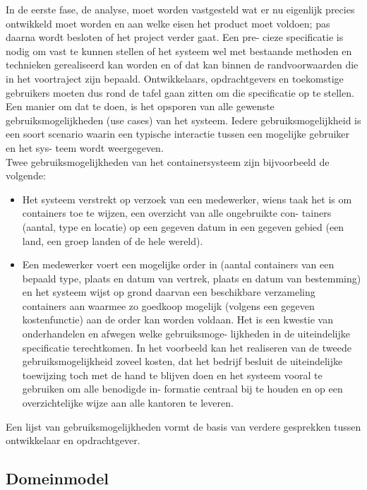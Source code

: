 \documentclass{article}
\begin{document}
	In de eerste fase, de analyse, moet worden vastgesteld wat er nu eigenlijk
	precies ontwikkeld moet worden en aan welke eisen het product moet
	voldoen; pas daarna wordt besloten of het project verder gaat. Een pre-
	cieze specificatie is nodig om vast te kunnen stellen of het systeem wel
	met bestaande methoden en technieken gerealiseerd kan worden en of
	dat kan binnen de randvoorwaarden die in het voortraject zijn bepaald.
	Ontwikkelaars, opdrachtgevers en toekomstige gebruikers moeten dus
	rond de tafel gaan zitten om die specificatie op te stellen. Een manier om
	dat te doen, is het opsporen van alle gewenste gebruiksmogelijkheden (use
	cases) van het systeem. Iedere gebruiksmogelijkheid is een soort scenario
	waarin een typische interactie tussen een mogelijke gebruiker en het sys-
	teem wordt weergegeven. \\
	Twee gebruiksmogelijkheden van het containersysteem zijn bijvoorbeeld
	de volgende: \\
	\begin{itemize}
		\item Het systeem verstrekt op verzoek van een medewerker, wiens taak het
		is om containers toe te wijzen, een overzicht van alle ongebruikte con-
		tainers (aantal, type en locatie) op een gegeven datum in een gegeven
		gebied (een land, een groep landen of de hele wereld).
		\item Een medewerker voert een mogelijke order in (aantal containers van
		een bepaald type, plaats en datum van vertrek, plaats en datum van
		bestemming) en het systeem wijst op grond daarvan een beschikbare
		verzameling containers aan waarmee zo goedkoop mogelijk (volgens
		een gegeven kostenfunctie) aan de order kan worden voldaan.
		Het is een kwestie van onderhandelen en afwegen welke gebruiksmoge-
		lijkheden in de uiteindelijke specificatie terechtkomen. In het voorbeeld
		kan het realiseren van de tweede gebruiksmogelijkheid zoveel kosten,
		dat het bedrijf besluit de uiteindelijke toewijzing toch met de hand te
		blijven doen en het systeem vooral te gebruiken om alle benodigde in-
		formatie centraal bij te houden en op een overzichtelijke wijze aan alle
		kantoren te leveren.	
	\end{itemize}
	
	Een lijst van gebruiksmogelijkheden vormt de basis van verdere
	gesprekken tussen ontwikkelaar en opdrachtgever.
	
	\subsection{Domeinmodel}
	
\end{document}
